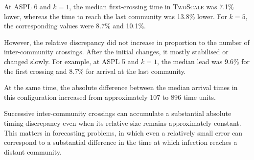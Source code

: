 \documentclass[a4paper,fleqn]{cas-sc}
\newcommand{\TS}{\textup{\textsc{TwoScale}}}
\begin{document}
At ASPL 6 and $k=1$, the median first-crossing time in \TS{} was 7.1\% lower, whereas the time to reach the last community was 13.8\% lower. For $k=5$, the corresponding values were 8.7\% and 10.1\%.

However, the relative discrepancy did not increase in proportion to the number of inter-community crossings. After the initial changes, it mostly stabilised or changed slowly. For example, at ASPL 5 and $k=1$, the median lead was 9.6\% for the first crossing and 8.7\% for arrival at the last community.

At the same time, the absolute difference between the median arrival times in this configuration increased from approximately 107 to 896 time units.

Successive inter-community crossings can accumulate a substantial absolute timing discrepancy even when its relative size remains approximately constant. This matters in forecasting problems, in which even a relatively small error can correspond to a substantial difference in the time at which infection reaches a distant community.
\end{document}
